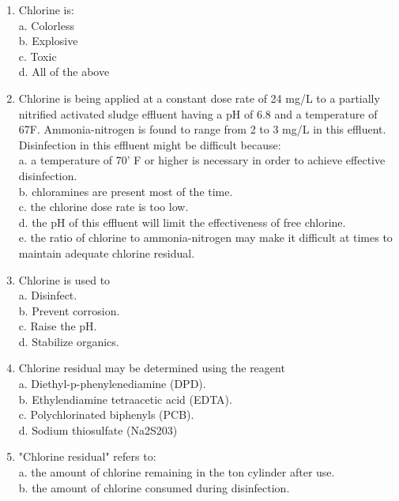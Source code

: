 \begin{tcolorbox}[breakable, enhanced,
colframe=blue!25,
colback=blue!10,
coltitle=blue!20!black,  
title= Chapter Assessment]
\begin{enumerate}
a. Colorless. \\
b. Heavier than air. \\
c. Non-toxic. \\
d. Odorless. \\
\item Chlorine is: \\
a. Colorless \\
b. Explosive \\
c. Toxic \\
d. All of the above \\
\item Chlorine is being applied at a constant dose rate of 24 mg/L to a partially nitrified activated sludge effluent having a pH of 6.8 and a temperature of 67F.  Ammonia-nitrogen is found to range from 2 to 3 mg/L in this effluent. Disinfection in this effluent might be difficult because: \\
a. a temperature of 70' F or higher is necessary in order to achieve effective disinfection. \\
b. chloramines are present most of the time. \\
c. the chlorine dose rate is too low. \\
d. the pH of this effluent will limit the effectiveness of free chlorine. \\
e. the ratio of chlorine to ammonia-nitrogen may make it difficult at times to maintain adequate chlorine residual. \\
\item Chlorine is used to \\
a. Disinfect. \\
b. Prevent corrosion. \\
c. Raise the pH. \\
d. Stabilize organics. \\
\item Chlorine residual may be determined using the reagent \\
a. Diethyl-p-phenylenediamine (DPD). \\
b. Ethylendiamine tetraacetic acid (EDTA). \\
c. Polychlorinated biphenyls (PCB). \\
d. Sodium thiosulfate (Na2S203) \\
\item "Chlorine residual" refers to: \\
a. the amount of chlorine remaining in the ton cylinder after use. \\
b. the amount of chlorine consumed during disinfection. \\

\end{enumerate}
\end{tcolorbox}
